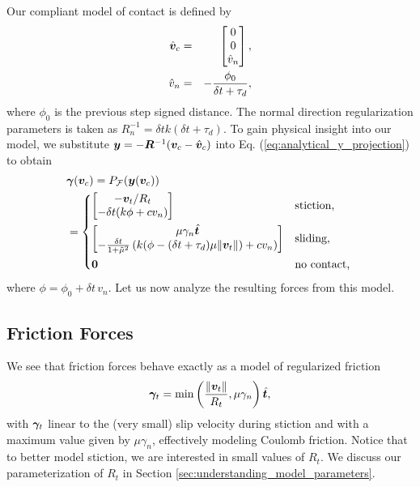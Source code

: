 Our compliant model of contact is defined by
\begin{eqnarray*}
	\hat{{\bm{v}}}_c &=&
	\begin{bmatrix}
		0\\
		0\\
		\hat{v}_n \end{bmatrix}\nonumber,\\
	\hat{v}_n &=& -\frac{\phi_0}{\delta t+\tau_d},
\end{eqnarray*}
where $\phi_0$ is the previous step signed distance. The normal direction
regularization parameters is taken as $R_n^{-1} = \delta t
k(\delta t+\tau_d)$. To gain physical insight into our model, we substitute
${\bm{y}}=-{\bm{R}}^{-1}({\bm{v}}_c - \hat{{\bm{v}}}_c)$ into Eq.
(\ref{eq:analytical_y_projection}) to obtain
\begin{align*}
	&{\bm\gamma}({\bm{v}}_c) = P_\mathcal{F}({\bm{y}}({\bm{v}}_c))\\
&=\begin{dcases}
	\begin{bmatrix}
		-{\bm{v}}_t/R_t\\
		-\delta t(k\phi + c v_n)
	\end{bmatrix}
	& \text{stiction, } \\
	\begin{bmatrix}
		\mu\gamma_n\hat{{\bm{t}}}\\
		-\frac{\delta t}{1+\tilde\mu^2}\left(k(\phi-(\delta
		t+\tau_d)\mu\Vert{\bm{v}}_t\Vert) + cv_n \right)
	\end{bmatrix}
	& \text{sliding, }\\
    {\bm{0}} & \text{no contact, } \end{dcases}\nonumber	
\end{align*}
where $\phi= \phi_0 + \delta t\,v_n$. Let us now analyze the resulting forces
from this model.

\subsection{Friction Forces}
We see that friction forces behave
exactly as a model of regularized friction
\begin{equation*}
	{\bm\gamma}_t = \min\left(\frac{\Vert{\bm{v}}_t\Vert}{R_t}, \mu\gamma_n\right)\hat{{\bm{t}}},
\end{equation*}
with ${\bm\gamma}_t$ linear to the (very small) slip velocity during stiction and
with a maximum value given by $\mu\gamma_n$, effectively modeling Coulomb
friction. Notice that to better model stiction, we are interested in small
values of $R_t$. We discuss our parameterization of $R_t$ in
Section \ref{sec:understanding_model_parameters}.

